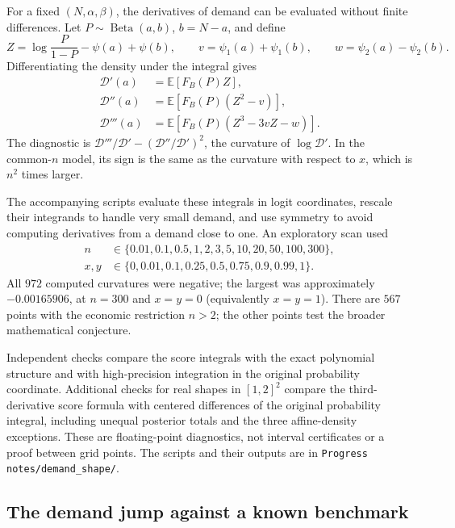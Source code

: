 \documentclass[11pt]{article}
\newcommand{\E}{\mathbb E}
\DeclareMathOperator{\Beta}{Beta}
\theoremstyle{definition}
\begin{document}
For a fixed $(N,\alpha,\beta)$, the derivatives of demand can be evaluated
without finite differences. Let $P\sim\Beta(a,b)$, $b=N-a$, and define
\begin{equation*}
Z=\log\frac{P}{1-P}-\psi(a)+\psi(b),\qquad
v=\psi_1(a)+\psi_1(b),\qquad
w=\psi_2(a)-\psi_2(b).
\end{equation*}
Differentiating the density under the integral gives
\begin{equation*}
\begin{aligned}
\mathcal D'(a)&=\E[F_B(P)Z],\\
\mathcal D''(a)&=\E[F_B(P)(Z^2-v)],\\
\mathcal D'''(a)&=\E[F_B(P)(Z^3-3vZ-w)].
\end{aligned}
\end{equation*}
The diagnostic is $\mathcal D'''/\mathcal D'-(\mathcal D''/\mathcal D')^2$,
the curvature of $\log\mathcal D'$. In the common-$n$ model, its sign is
the same as the curvature with respect to $x$, which is $n^2$ times larger.

The accompanying scripts evaluate these integrals in logit coordinates,
rescale their integrands to handle very small demand, and use symmetry to
avoid computing derivatives from a demand close to one. An exploratory
scan used
\begin{equation*}
\begin{aligned}
n&\in\{0.01,0.1,0.5,1,2,3,5,10,20,50,100,300\},\\
x,y&\in\{0,0.01,0.1,0.25,0.5,0.75,0.9,0.99,1\}.
\end{aligned}
\end{equation*}
All $972$ computed curvatures were negative; the largest was approximately
$-0.00165906$, at $n=300$ and $x=y=0$ (equivalently $x=y=1$).
There are $567$ points with the economic restriction $n>2$; the other
points test the broader mathematical conjecture.

Independent checks compare the score integrals with the exact polynomial
structure and with high-precision integration in the original probability
coordinate. Additional checks for real shapes in $[1,2]^2$ compare the
third-derivative score formula with centered differences of the original
probability integral, including unequal posterior totals and the three
affine-density exceptions. These are floating-point diagnostics, not interval certificates
or a proof between grid points. The scripts and their outputs are in
\texttt{Progress notes/demand\_shape/}.

\subsection{The demand jump against a known benchmark}
\end{document}
